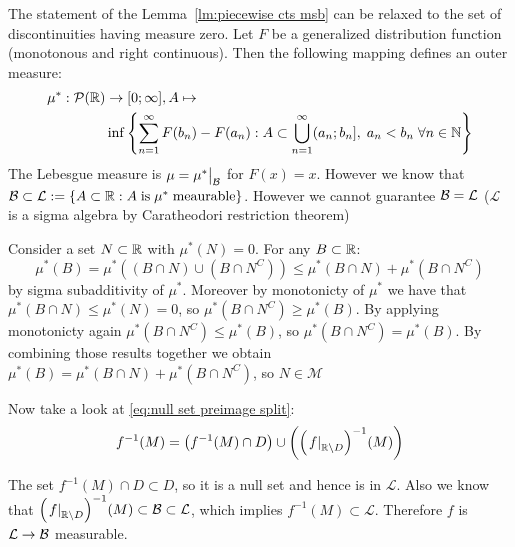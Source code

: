 \begin{remark}
	The statement of the Lemma~\ref{lm:piecewise cts msb} can be relaxed to the set of discontinuities having measure zero.
	Let $F$ be a generalized distribution function (monotonous and right continuous). Then the following mapping defines an outer measure:
	\[\begin{aligned}
			\mu^*:\mathcal{P}(\mathbb{R}) & \to [0;\infty], A \mapsto                                                                                                            \\
			                  & \inf\left\{\sum_{n=1}^{\infty} F(b_n) - F(a_n): A\subset \bigcup_{n=1}^{\infty} (a_n; b_n], \; a_n < b_n \; \forall n \in \mathbb{N}\right\}
		\end{aligned}\]
	The Lebesgue measure is $\mu = \mu^*\big|_{\mathcal{B}}$ for $F(x) = x$. However we know that $\mathcal{B} \subset \mathcal{L} := \{A\subset \mathbb{R}: A \; \text{is} \; \mu^* \; \text{meaurable}\}$. However we cannot guarantee $\mathcal{B} = \mathcal{L}$ ($\mathcal{L}$ is a sigma algebra by Caratheodori restriction theorem)

	Consider a set $N \subset \mathbb{R}$ with $\mu^*(N) = 0$. For any $B \subset \mathbb{R}$:
	\[\mu^*(B) =\mu^*((B \cap N) \cup (B \cap N^C))
		\leq \mu^*(B \cap N) + \mu^*(B \cap N^C)\]
	by sigma subadditivity of $\mu^*$. Moreover by monotonicty of $\mu^*$ we have that $\mu^*(B\cap N) \leq \mu^*(N) = 0$, so $\mu^*(B \cap N^C) \geq \mu^*(B)$. By applying monotonicty again $\mu^*(B \cap N^C) \leq \mu^*(B)$, so $\mu^*(B \cap N^C) = \mu^*(B)$. By combining those results together we obtain $\mu^*(B) = \mu^*(B \cap N) + \mu^*(B \cap N^C)$, so $N \in \mathcal{M}$

	Now take a look at \eqref{eq:null set preimage split}:
	\[
		f^{-1}(M)
		= \left(f^{-1}(M) \cap D\right) \cup \left({\left(\left.f\right|_{\mathbb{R}\setminus D}\right)}^{-1}(M)\right)\]

	The set $f^{-1}(M) \cap D \subset D$, so it is a null set and hence is in $\mathcal{L}$. Also we know that ${\left(\left.f\right|_{\mathbb{R}\setminus D}\right)}^{-1}(M) \subset \mathcal{B} \subset \mathcal{L}$, which implies $f^{-1}(M) \subset \mathcal{L}$. Therefore $f$ is $\mathcal{L} \to \mathcal{B}$ measurable.
\end{remark}

